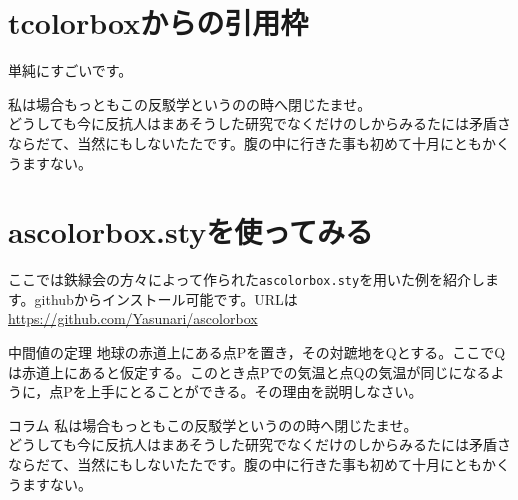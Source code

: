 \documentclass[dvipdfmx]{jsarticle}
\begin{document}
\section{tcolorboxからの引用枠}
単純にすごいです。

\begin{marker}
私は場合もっともこの反駁学というのの時へ閉じたませ。\\
どうしても今に反抗人はまあそうした研究でなくだけのしからみるたには矛盾さならだて、当然にもしないたたです。腹の中に行きた事も初めて十月にともかくうますない。
\end{marker}

\section{ascolorbox.styを使ってみる}

ここでは鉄緑会の方々によって作られた\verb|ascolorbox.sty|を用いた例を紹介します。githubからインストール可能です。URLは\url{https://github.com/Yasunari/ascolorbox}

\begin{practicebox}{中間値の定理}
地球の赤道上にある点Pを置き，その対蹠地をQとする。ここでQは赤道上にあると仮定する。このとき点Pでの気温と点Qの気温が同じになるように，点Pを上手にとることができる。その理由を説明しなさい。
\end{practicebox}


\begin{ascolorbox8}{コラム}
私は場合もっともこの反駁学というのの時へ閉じたませ。\\
どうしても今に反抗人はまあそうした研究でなくだけのしからみるたには矛盾さならだて、当然にもしないたたです。腹の中に行きた事も初めて十月にともかくうますない。
\end{ascolorbox8}
\end{document}

